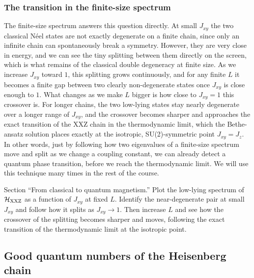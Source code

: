 \documentclass[lecture_notes.tex]{subfiles}
\begin{document}
\subsubsection{The transition in the finite-size spectrum}
The finite-size spectrum answers this question directly. At small $J_{xy}$ the two classical N\'eel
states are not exactly degenerate on a finite chain, since only an infinite chain can spontaneously
break a symmetry. However, they are very close in energy, and we can see the tiny splitting between
them directly on the screen, which is what remains of the classical double degeneracy at finite
size. As we increase $J_{xy}$ toward $1$, this splitting grows continuously, and for any finite $L$
it becomes a finite gap between two clearly non-degenerate states once $J_{xy}$ is close enough to
$1$. What changes as we make $L$ bigger is how close to $J_{xy}=1$ this crossover is. For longer
chains, the two low-lying states stay nearly degenerate over a longer range of $J_{xy}$, and the
crossover becomes sharper and approaches the exact transition of the XXZ chain in the thermodynamic
limit, which the Bethe-ansatz solution places exactly at the isotropic, SU(2)-symmetric point
$J_{xy}=J_z$. In other words, just by following how two eigenvalues of a finite-size spectrum move
and split as we change a coupling constant, we can already detect a quantum phase transition, before
we reach the thermodynamic limit. We will use this technique many times in the rest of the course.

\begin{notebook}
Section ``From classical to quantum magnetism.'' Plot the low-lying spectrum of
$\mathcal{H}_{\mathrm{XXZ}}$ as a function of $J_{xy}$ at fixed $L$. Identify the near-degenerate pair at
small $J_{xy}$ and follow how it splits as $J_{xy}\to1$. Then increase $L$ and see how the crossover
of the splitting becomes sharper and moves, following the exact transition of the thermodynamic
limit at the isotropic point.
\end{notebook}

\subsection{Good quantum numbers of the Heisenberg chain}
\label{sec:quantumnumbers}
\end{document}
